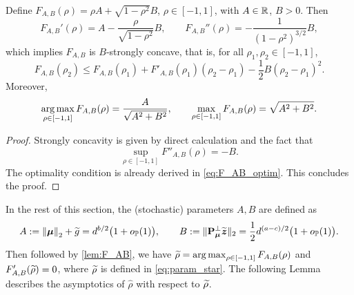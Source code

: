 \begin{lem} \label{lem:F_AB}
    Define $F_{A, B}(\rho) = \rho A + \sqrt{1 - \rho^2} B$, $\rho \in [-1, 1]$, with $A \in \mathbb{R}$, $B > 0$. Then
\begin{equation*}
    F_{A, B}'(\rho) = A - \frac{\rho}{\sqrt{1 - \rho^2}} B,
    \qquad
    F_{A, B}''(\rho) = -\frac{1}{(1 - \rho^2)^{3/2}} B,
\end{equation*}
which implies $F_{A,B}$ is $B$-strongly concave, that is, for all $\rho_1, \rho_2 \in [-1, 1]$,
\begin{equation*}
    F_{A,B}(\rho_2) \le F_{A,B}(\rho_1) + F'_{A,B}(\rho_1)(\rho_2 - \rho_1) - \frac12 B (\rho_2 - \rho_1)^2.
\end{equation*} 
Moreover,
\begin{equation*}
    \operatorname*{arg\,max}_{\rho \in [-1, 1]} F_{A,B}(\rho) = \frac{A}{\sqrt{A^2 + B^2}},  \qquad \max_{\rho \in [-1, 1]} F_{A,B}(\rho) = \sqrt{A^2 + B^2}.
\end{equation*}
\end{lem}
\begin{proof}
    Strongly concavity is given by direct calculation and the fact that
    \begin{equation*}
        \sup_{\rho \in [-1, 1]} F''_{A,B}(\rho) = -B.
    \end{equation*}
    The optimality condition is already derived in \cref{eq:F_AB_optim}. This concludes the proof.
\end{proof}

\noindent
In the rest of this section, the (stochastic) parameters $A, B$ are defined as
\begin{equation} \label{eq:AB_def}
    A := \left\|{{\boldsymbol{\mu}}}\right\|_2 + \widetilde g
    = d^{b/2} \bigl(1 + o_{\mathbb{P}}(1)\bigr),
    \qquad
    B := \| \mathrm{\bf P}_{{\boldsymbol{\mu}}}^\perp \widetilde{\text{\boldmath $z$}} \|_2
    = \frac12 d^{(a-c)/2} \bigl(1 + o_{\mathbb{P}}(1)\bigr).
\end{equation}
Then followed by \cref{lem:F_AB}, we have $\widetilde\rho = \operatorname*{arg\,max}_{\rho \in [-1, 1]} F_{A,B}(\rho)$ and $F'_{A,B}(\widetilde\rho) = 0$, where $\widetilde\rho$ is defined in \cref{eq:param_star}. The following Lemma describes the asymptotics of $\hat\rho$ with respect to $\widetilde\rho$.

